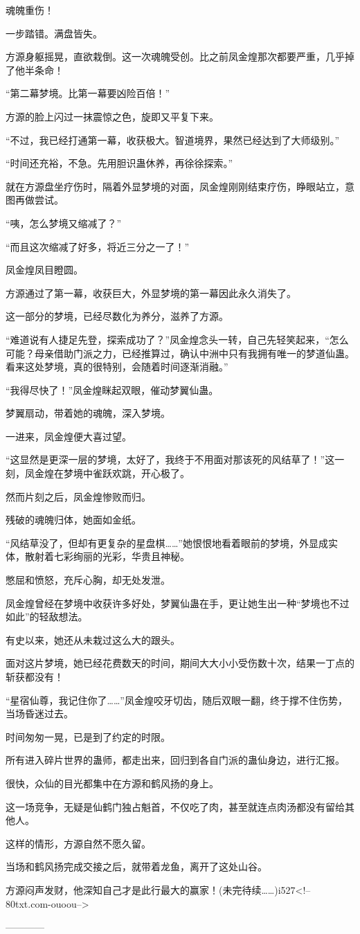 \begin{this_body}
魂魄重伤！

一步踏错。满盘皆失。

方源身躯摇晃，直欲栽倒。这一次魂魄受创。比之前凤金煌那次都要严重，几乎掉了他半条命！

“第二幕梦境。比第一幕要凶险百倍！”

方源的脸上闪过一抹震惊之色，旋即又平复下来。

“不过，我已经打通第一幕，收获极大。智道境界，果然已经达到了大师级别。”

“时间还充裕，不急。先用胆识蛊休养，再徐徐探索。”

就在方源盘坐疗伤时，隔着外显梦境的对面，凤金煌刚刚结束疗伤，睁眼站立，意图再做尝试。

“咦，怎么梦境又缩减了？”

“而且这次缩减了好多，将近三分之一了！”

凤金煌凤目瞪圆。

方源通过了第一幕，收获巨大，外显梦境的第一幕因此永久消失了。

这一部分的梦境，已经尽数化为养分，滋养了方源。

“难道说有人捷足先登，探索成功了？”凤金煌念头一转，自己先轻笑起来，“怎么可能？母亲借助门派之力，已经推算过，确认中洲中只有我拥有唯一的梦道仙蛊。看来这处梦境，真的很特别，会随着时间逐渐消融。”

“我得尽快了！”凤金煌眯起双眼，催动梦翼仙蛊。

梦翼扇动，带着她的魂魄，深入梦境。

一进来，凤金煌便大喜过望。

“这显然是更深一层的梦境，太好了，我终于不用面对那该死的风结草了！”这一刻，凤金煌在梦境中雀跃欢跳，开心极了。

然而片刻之后，凤金煌惨败而归。

残破的魂魄归体，她面如金纸。

“风结草没了，但却有更复杂的星盘棋……”她恨恨地看着眼前的梦境，外显成实体，散射着七彩绚丽的光彩，华贵且神秘。

憋屈和愤怒，充斥心胸，却无处发泄。

凤金煌曾经在梦境中收获许多好处，梦翼仙蛊在手，更让她生出一种“梦境也不过如此”的轻敌想法。

有史以来，她还从未栽过这么大的跟头。

面对这片梦境，她已经花费数天的时间，期间大大小小受伤数十次，结果一丁点的斩获都没有！

“星宿仙尊，我记住你了……”凤金煌咬牙切齿，随后双眼一翻，终于撑不住伤势，当场昏迷过去。

时间匆匆一晃，已是到了约定的时限。

所有进入碎片世界的蛊师，都走出来，回归到各自门派的蛊仙身边，进行汇报。

很快，众仙的目光都集中在方源和鹤风扬的身上。

这一场竞争，无疑是仙鹤门独占魁首，不仅吃了肉，甚至就连点肉汤都没有留给其他人。

这样的情形，方源自然不愿久留。

当场和鹤风扬完成交接之后，就带着龙鱼，离开了这处山谷。

方源闷声发财，他深知自己才是此行最大的赢家！(未完待续……)i527<!--80txt.com-ouoou-->

------------

\end{this_body}

